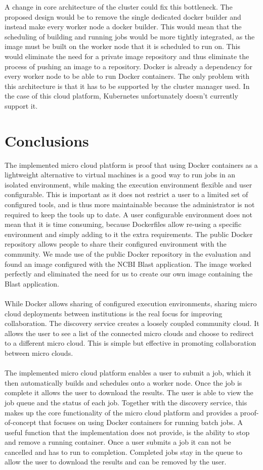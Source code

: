 \documentclass{sig-alternate-05-2015}
\begin{document}
A change in core architecture of the cluster could fix this bottleneck. The proposed design would be to remove the single dedicated docker builder and instead make every worker node a docker builder. This would mean that the scheduling of building and running jobs would be more tightly integrated, as the image must be built on the worker node that it is scheduled to run on. This would eliminate the need for a private image repository and thus eliminate the process of pushing an image to a repository. Docker is already a dependency for every worker node to be able to run Docker containers. The only problem with this architecture is that it has to be supported by the cluster manager used. In the case of this cloud platform, Kubernetes unfortunately doesn't currently support it. 

\section{Conclusions}
The implemented micro cloud platform is proof that using Docker containers as a lightweight alternative to virtual machines is a good way to run jobs in an isolated environment, while making the execution environment flexible and user configurable. This is important as it does not restrict a user to a limited set of configured tools, and is thus more maintainable because the administrator is not required to keep the tools up to date. A user configurable environment does not mean that it is time consuming, because Dockerfiles allow re-using a specific environment and simply adding to it the extra requirements. The public Docker repository allows people to share their configured environment with the community. We made use of the public Docker repository in the evaluation and found an image configured with the NCBI Blast application. The image worked perfectly and eliminated the need for us to create our own image containing the Blast application.
\\\\
While Docker allows sharing of configured execution environments, sharing micro cloud deployments between institutions is the real focus for improving collaboration. The discovery service creates a loosely coupled community cloud. It allows the user to see a list of the connected micro clouds and choose to redirect to a different micro cloud. This is simple but effective in promoting collaboration between micro clouds.
\\\\
The implemented micro cloud platform enables a user to submit a job, which it then automatically builds and schedules onto a worker node. Once the job is complete it allows the user to download the results. The user is able to view the job queue and the status of each job. Together with the discovery service, this makes up the core functionality of the micro cloud platform and provides a proof-of-concept that focuses on using Docker containers for running batch jobs. A useful function that the implementation does not provide, is the ability to stop and remove a running container. Once a user submits a job it can not be cancelled and has to run to completion. Completed jobs stay in the queue to allow the user to download the results and can be removed by the user. 
\end{document}
